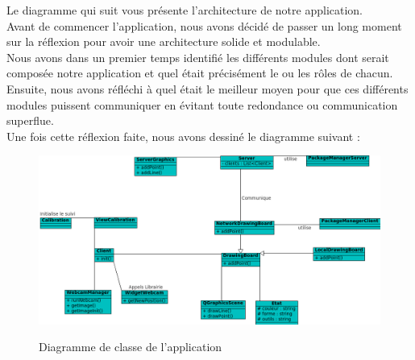 \documentclass{report}
\begin{document}
				\newpage			
				Le diagramme qui suit vous présente l'architecture de notre application. \\
Avant de commencer l'application, nous avons décidé de passer un long moment sur la réflexion pour avoir une architecture solide et modulable.\\Nous avons dans un premier temps identifié les différents modules dont serait composée notre application et quel était précisément le ou les rôles de chacun. \\Ensuite, nous avons réfléchi à quel était le meilleur moyen pour que ces différents modules puissent communiquer en évitant toute redondance ou communication superflue. \\Une fois cette réflexion faite, nous avons dessiné le diagramme suivant : \\
				\begin{figure}[!h]
						\centering
						\includegraphics[scale=0.6]{../uml/classes.png}\\
						\caption{Diagramme de classe de l'application}
						\label{Diagramme de classe de l'application}
				\end{figure}
				
\end{document}
